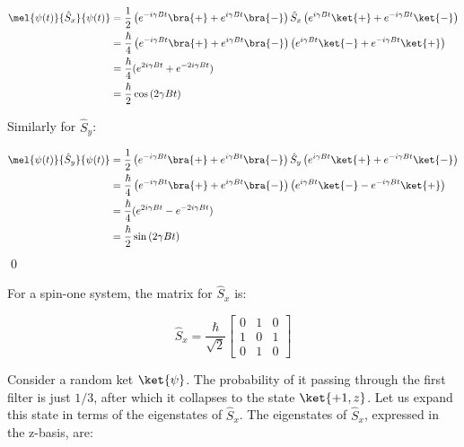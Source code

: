 \documentclass[12pt]{article}
\begin{document}
\begin{equation}
\begin{split}
    \mel{\psi(t)}{\hat{S}_{x}}{\psi(t)} &= \frac{1}{2} \left( e^{-i\gamma B t} \bra{+} + e^{i\gamma B t} \bra{-}  \right) \hat{S}_{x} \left( e^{i\gamma B t} \ket{+} + e^{-i\gamma B t} \ket{-} \right) \\
    &= \frac{\hbar}{4} \left( e^{-i\gamma B t} \bra{+} + e^{i\gamma B t} \bra{-} \right) \left( e^{i\gamma B t} \ket{-} + e^{-i\gamma B t} \ket{+} \right) \\
    &= \frac{\hbar}{4} (e^{2i\gamma B t} + e^{-2i\gamma B t}) \\
    &= \frac{\hbar}{2} \cos{(2\gamma B t)}
\end{split}
\end{equation}

Similarly for $\hat{S}_{y}$:

\begin{equation}
\begin{split}
    \mel{\psi(t)}{\hat{S}_{y}}{\psi(t)} &= \frac{1}{2} \left( e^{-i\gamma B t} \bra{+} + e^{i\gamma B t} \bra{-}  \right) \hat{S}_{y} \left( e^{i\gamma B t} \ket{+} + e^{-i\gamma B t} \ket{-} \right) \\
    &= \frac{\hbar}{4} \left( e^{-i\gamma B t} \bra{+} + e^{i\gamma B t} \bra{-} \right) \left( e^{i\gamma B t} \ket{-} - e^{-i\gamma B t} \ket{+} \right) \\
    &= \frac{\hbar}{4} (e^{2i\gamma B t} - e^{-2i\gamma B t}) \\
    &= \frac{\hbar}{2} \sin{(2\gamma B t)}
\end{split}
\end{equation}
\qed


For a spin-one system, the matrix for $\hat{S}_{x}$ is:

\begin{equation}
    \hat{S}_{x} = \frac{\hbar}{\sqrt{2}}
    \begin{bmatrix}
        0 & 1 & 0 \\
        1 & 0 & 1 \\
        0 & 1 & 0
    \end{bmatrix}
\end{equation}

Consider a random ket $\ket{\psi}$. The probability of it passing through the first filter is just $1/3$, after which it collapses to the state $\ket{+1, z}$. Let us expand this state in terms of the eigenstates of $\hat{S}_{x}$. The eigenstates of $\hat{S}_{x}$, expressed in the z-basis, are:
\end{document}
